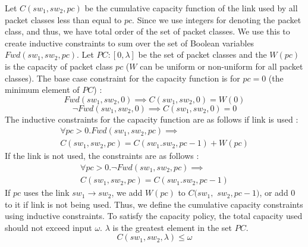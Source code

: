 Let $C(sw_1,sw_2,pc)$ be the cumulative capacity function of the link used by all packet classes less than equal to $pc$. Since we use integers for denoting the packet class, and thus, we have total order of the set of packet classes. We use this to create inductive constraints to sum over the set of Boolean variables $Fwd(sw_1, sw_2,pc)$. Let $PC : [0, \lambda]$ be the set of packet classes and the $W(pc)$ is the capacity of packet class $pc$ ($W$ can be uniform or non-uniform for all packet classes). 
The base case constraint for the capacity function is for $pc = 0$ (the minimum element of $PC$) :
\begin{equation}
	Fwd(sw_1, sw_2, 0) \implies C(sw_1, sw_2, 0) = W(0)
\end{equation}
\begin{equation}
	\neg Fwd(sw_1, sw_2, 0) \implies C(sw_1, sw_2, 0) = 0
\end{equation} 
The inductive constraints for the capacity function are as follows if link is used : 
\begin{multline}
	\forall pc > 0. Fwd(sw_1,sw_2,pc) \implies \\ C(sw_1, sw_2, pc) =  C(sw_1. sw_2, pc - 1) + W(pc)
\end{multline}
If the link is not used, the constraints are as follows : 
\begin{multline}
\forall pc > 0. \neg Fwd(sw_1,sw_2,pc) \implies \\ C(sw_1, sw_2, pc) =  C(sw_1. sw_2, pc - 1)
\end{multline}
If $pc$ uses the link $sw_1 \rightarrow sw_2$, we add $W(pc)$ to $C(sw_1,$ $sw_2,pc-1)$, or add 0 to it if link is not being used. Thus, we define the cumulative capacity constraints using inductive constraints. To satisfy the capacity policy, the total capacity used should not exceed input $\omega$. $\lambda$ is the greatest element in the set $PC$. 
\begin{equation}
	C(sw_1, sw_2, \lambda) \leq \omega	
\end{equation} 